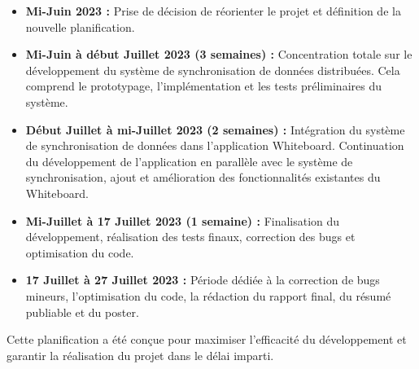 \begin{itemize}
    \item \textbf{Mi-Juin 2023 :} Prise de décision de réorienter le projet et définition de la nouvelle planification.
    \item \textbf{Mi-Juin à début Juillet 2023 (3 semaines) :} Concentration totale sur le développement du système de synchronisation de données distribuées. Cela comprend le prototypage, l'implémentation et les tests préliminaires du système.
    \item \textbf{Début Juillet à mi-Juillet 2023 (2 semaines) :} Intégration du système de synchronisation de données dans l'application Whiteboard. Continuation du développement de l'application en parallèle avec le système de synchronisation, ajout et amélioration des fonctionnalités existantes du Whiteboard.
    \item \textbf{Mi-Juillet à 17 Juillet 2023 (1 semaine) :} Finalisation du développement, réalisation des tests finaux, correction des bugs et optimisation du code.
    \item \textbf{17 Juillet à 27 Juillet 2023 :} Période dédiée à la correction de bugs mineurs, l'optimisation du code, la rédaction du rapport final, du résumé publiable et du poster.
\end{itemize}

Cette planification a été conçue pour maximiser l'efficacité du développement et garantir la réalisation du projet dans le délai imparti.
